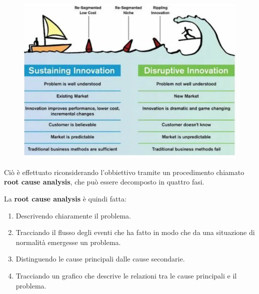 \documentclass[a4paper,11pt,oneside]{book}
\begin{document}
\begin{figure}[!h]
	\centering
	\includegraphics[scale=0.6]{"immagini/Disruptive Innovation"}
\end{figure}

Ciò è effettuato riconsiderando l'obbiettivo tramite un procedimento chiamato \textbf{root cause analysis}, che può essere decomposto in quattro fasi.

La \textbf{root cause analysis} è quindi fatta:

\begin{enumerate}
	\item Descrivendo chiaramente il problema.
	\item Tracciando il flusso degli eventi che ha fatto in modo che da una situazione di normalità emergesse un problema.
	\item Distinguendo le cause principali dalle cause secondarie.
	\item Tracciando un grafico che descrive le relazioni tra le cause principali e il problema.
\end{enumerate}
\end{document}

